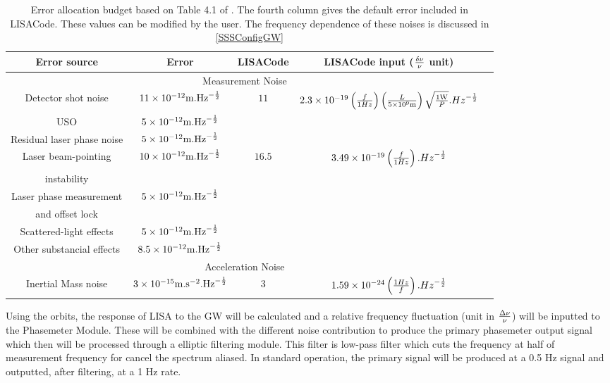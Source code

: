 \documentclass[a4paper,english,12pt]{article}
\begin{document}
\begin{table}[htdp] 
\caption{Error allocation budget based on Table 4.1 of  \cite{LISAPPA}.  
The fourth column gives the default error included in LISACode. These values can be  
modified by the user. The frequency dependence of these noises is discussed in \ref{SSSConfigGW}} 
\begin{center} 
\small
\begin{tabular}{|c|c|c|c|c|} 
\hline 
Error source & Error & LISACode & LISACode input ($\delta \nu \over \nu $ unit)  \\ 
\hline 
\multicolumn{4}{|c|}{Measurement Noise}  \\ 
\hline 
Detector shot noise&$11\times 10^{-12} {\rm m.{Hz}^{-{1 \over 2}}}$&$11$ & \footnotesize$ 2.3 \times 10^{-19}\left(f\over 1 Hz \right) \left(L \over 5 \times 10^{9}{\rm m} \right) \sqrt{1 {\rm  W}\over P }.{Hz}^{-{1 \over 2}} $\small \\ 
\hline 
USO & $5 \times10^{-12} {\rm m.{Hz}^{-{1 \over 2}}}$& &  \\  
\cline{1-2} 
Residual laser phase noise&$5 \times 10^{-12} {\rm m.{Hz}^{-{1 \over 2}}}$& &  \\ 
\cline{1-2} 
Laser beam-pointing &$10 \times10^{-12} {\rm m.{Hz}^{-{1 \over 2}}}$& $16.5$ & $3.49 \times 10^{-19} \left(f\over 1 Hz \right).{Hz}^{-{1 \over 2}}$\\ 
instability& & &  \\ 
\cline{1-2} 
Laser phase measurement &$5\times10^{-12} {\rm m.{Hz}^{-{1 \over 2}}}$& &  \\ 
and offset lock& & &  \\ 
\cline{1-2} 
Scattered-light effects&$5\times10^{-12} {\rm m.{Hz}^{-{1 \over 2}}}$& &  \\ 
\cline{1-2} 
Other substancial effects&$8.5\times10^{-12} {\rm m.{Hz}^{-{1 \over 2}}}$& & \\ 
\hline 
\multicolumn{4}{|c|}{Acceleration Noise}  \\ 
\hline 
Inertial Mass noise & $3 \times10^{-15}{\rm m.s^{-2}.{Hz}^{-{1 \over 2}}}$& $3 $ & $1.59 \times 10^{-24} \left( 1 Hz \over f\right).{Hz}^{-{1 \over 2}}$\\ 
\hline 
\end{tabular} 
\end{center} 
\label{table_error} 
\end{table}%
\normalsize

Using the orbits, the response of LISA to the GW will be calculated and a relative frequency fluctuation (unit in $\Delta \nu \over \nu$) will be inputted to the Phasemeter Module. These will be combined with the different noise contribution to produce the primary phasemeter output signal which then will be processed through a elliptic filtering module. This filter is low-pass filter which cuts the frequency at half of measurement frequency for cancel the spectrum aliased. In standard operation, the primary signal will be produced at a 0.5 Hz signal and outputted, after filtering, at a 1 Hz rate. \\
\end{document}
